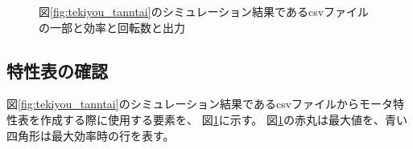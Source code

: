 \begin{figure}[t]
	\centering
	\caption{図\ref{fig:tekiyou_tanntai}のシミュレーション結果であるcsvファイルの一部と効率と回転数と出力}
	\label{fig:tekiyou_csv_wakariyasui}
\end{figure}

\clearpage

\subsection{特性表の確認}
図\ref{fig:tekiyou_tanntai}のシミュレーション結果であるcsvファイルからモータ特性表を作成する際に使用する要素を、
図\ref{fig:tekiyou_csv_wakariyasui}に示す。
図\ref{fig:tekiyou_csv_wakariyasui}の赤丸は最大値を、青い四角形は最大効率時の行を表す。

